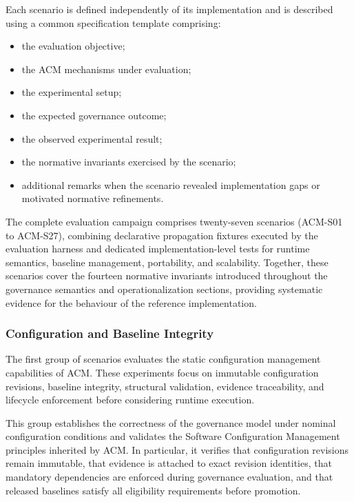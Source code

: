 \documentclass[10pt]{article}
\begin{document}
Each scenario is defined independently of its implementation and is described
using a common specification template comprising:

\begin{itemize}
    \item the evaluation objective;
    \item the ACM mechanisms under evaluation;
    \item the experimental setup;
    \item the expected governance outcome;
    \item the observed experimental result;
    \item the normative invariants exercised by the scenario;
    \item additional remarks when the scenario revealed implementation gaps or
          motivated normative refinements.
\end{itemize}

The complete evaluation campaign comprises twenty-seven scenarios (ACM-S01 to
ACM-S27), combining declarative propagation fixtures executed by the evaluation
harness and dedicated implementation-level tests for runtime semantics,
baseline management, portability, and scalability. Together, these scenarios
cover the fourteen normative invariants introduced throughout the governance
semantics and operationalization sections, providing systematic evidence for
the behaviour of the reference implementation.

\subsubsection{Configuration and Baseline Integrity}
\label{appendix:configuration_baseline}

The first group of scenarios evaluates the static configuration management
capabilities of ACM. These experiments focus on immutable configuration
revisions, baseline integrity, structural validation, evidence traceability,
and lifecycle enforcement before considering runtime execution.

This group establishes the correctness of the governance model under nominal
configuration conditions and validates the Software Configuration Management
principles inherited by ACM. In particular, it verifies that configuration
revisions remain immutable, that evidence is attached to exact revision
identities, that mandatory dependencies are enforced during governance
evaluation, and that released baselines satisfy all eligibility requirements
before promotion.
\end{document}
